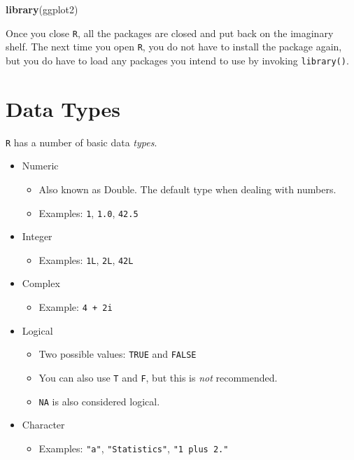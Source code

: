 \documentclass[]{book}
\newenvironment{Shaded}{\begin{snugshade}}{\end{snugshade}}
\newcommand{\KeywordTok}[1]{\textcolor[rgb]{0.13,0.29,0.53}{\textbf{#1}}}
\newcommand{\NormalTok}[1]{#1}
\providecommand{\tightlist}{%
  \setlength{\itemsep}{0pt}\setlength{\parskip}{0pt}}
\theoremstyle{definition}
\theoremstyle{definition}
\theoremstyle{definition}
\theoremstyle{remark}
\begin{document}
\begin{Shaded}
\begin{Highlighting}[]
\KeywordTok{library}\NormalTok{(ggplot2)}
\end{Highlighting}
\end{Shaded}

Once you close \texttt{R}, all the packages are closed and put back on
the imaginary shelf. The next time you open \texttt{R}, you do not have
to install the package again, but you do have to load any packages you
intend to use by invoking \texttt{library()}.

\section{Data Types}\label{data-types}

\texttt{R} has a number of basic data \emph{types}.

\begin{itemize}
\tightlist
\item
  Numeric

  \begin{itemize}
  \tightlist
  \item
    Also known as Double. The default type when dealing with numbers.
  \item
    Examples: \texttt{1}, \texttt{1.0}, \texttt{42.5}
  \end{itemize}
\item
  Integer

  \begin{itemize}
  \tightlist
  \item
    Examples: \texttt{1L}, \texttt{2L}, \texttt{42L}
  \end{itemize}
\item
  Complex

  \begin{itemize}
  \tightlist
  \item
    Example: \texttt{4\ +\ 2i}
  \end{itemize}
\item
  Logical

  \begin{itemize}
  \tightlist
  \item
    Two possible values: \texttt{TRUE} and \texttt{FALSE}
  \item
    You can also use \texttt{T} and \texttt{F}, but this is \emph{not}
    recommended.
  \item
    \texttt{NA} is also considered logical.
  \end{itemize}
\item
  Character

  \begin{itemize}
  \tightlist
  \item
    Examples: \texttt{"a"}, \texttt{"Statistics"},
    \texttt{"1\ plus\ 2."}
  \end{itemize}
\end{itemize}
\end{document}
